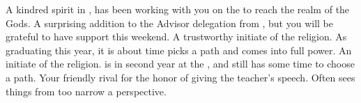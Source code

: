 \documentclass[char]{GL2020}
\begin{document}
\begin{contacts}
	\contact{\cCurse{}} A kindred spirit in \pFarm{}, \cCurse{} has been working with you on the \iBeansMB{} to reach the realm of the Gods.
\contact{\cEbbPriest{}} A surprising addition to the Advisor delegation from \pShip{}, but you will be grateful to have \cEbbPriest{\their} support this weekend.
	\contact{\cInitiate{}} A trustworthy initiate of the \pShippies{} religion. As \cInitiate{\they} \cInitiate{\are} graduating this year, it is about time \cInitiate{} picks a path and comes into \cInitiate{\their} full power.
\contact{\cWarlordDaughter{}} An initiate of the \pShippies{} religion. \cWarlordDaughter{} is in \cWarlordDaughter{\their} second year at the \pSc{}, and still has some time to choose a path.
\contact{\cPirate{}} Your friendly rival for the honor of giving the teacher’s speech. Often sees things from too narrow a perspective.
\end{contacts}
\end{document}
